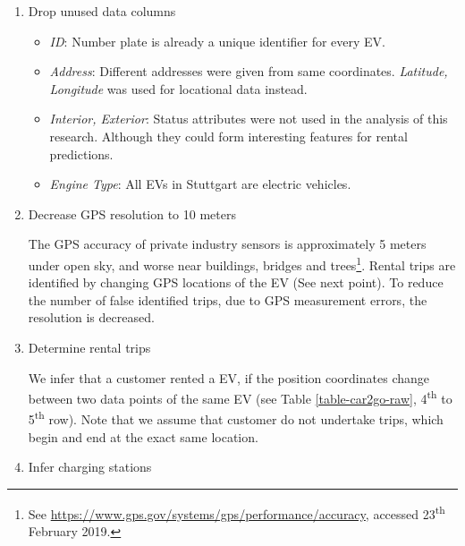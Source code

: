 \documentclass[a4paper, 12pt]{article}
\begin{document}
\begin{enumerate}
\item Drop unused data columns

\begin{itemize}
\item \emph{ID}: Number plate is already a unique identifier for every EV.
\item \emph{Address}: Different addresses were given from same coordinates. \emph{Latitude,
Longitude} was used for locational data instead.
\item \emph{Interior, Exterior}: Status attributes were not used in the analysis of
this research. Although they could form interesting features for rental
predictions.
\item \emph{Engine Type}: All EVs in Stuttgart are electric vehicles.
\end{itemize}
\item Decrease GPS resolution to 10 meters

The GPS accuracy of private industry sensors is approximately 5 meters under
open sky, and worse near buildings, bridges and trees\footnote{See \url{https://www.gps.gov/systems/gps/performance/accuracy}, accessed
23\textsuperscript{th} February 2019.}. Rental trips are
identified by changing GPS locations of the EV (See next point). To reduce
the number of false identified trips, due to GPS measurement errors, the resolution
is decreased.
\item Determine rental trips

We infer that a customer rented a EV, if the position coordinates change
between two data points of the same EV (see Table \ref{table-car2go-raw}, 4\textsuperscript{th}
to 5\textsuperscript{th} row). Note that we assume that customer do not undertake trips,
which begin and end at the exact same location.
\item Infer charging stations


\end{enumerate}
\end{document}
